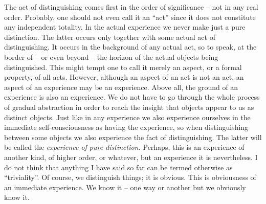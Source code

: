 The act of distinguishing comes first in the order of significance -- not in any real order. Probably, one should not even call it an ``act'' since it does not constitute any independent totality. In the actual experience we never make just a pure distinction. The latter occurs only together with some actual act of distinguishing. It occurs in the background of any actual act, so to speak, at the border of -- or even beyond -- the horizon of the actual objects being distinguished. This might tempt one to call it merely an aspect, or a formal property, of all acts. However, although an aspect of an act is not an act, an aspect of an experience may be an experience. Above all, the ground of an experience is also an experience. We do not have to go through the whole process of gradual abstraction in order to reach the insight that objects appear to us as distinct objects. Just like in any experience we also experience ourselves in the immediate self-consciousness as having the experience, so when distinguishing between some objects we also experience the fact of distinguishing. 
The latter will be called the {\em experience of pure distinction.}
Perhaps, this is an experience of another kind, of higher order, or whatever, but an experience it is nevertheless. I do not think that anything I have said so far can be termed otherwise as ``triviality''. Of course, we distinguish things; it is obvious. This is obviousness of an immediate experience. We know it -- one way or another but we obviously know it.

